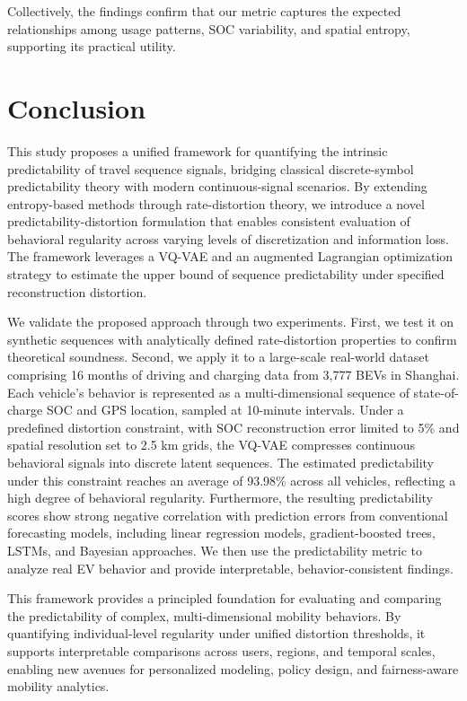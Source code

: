 \documentclass[12pt,review,authoryear]{elsarticle}
\theoremstyle{upright}
\begin{document}
Collectively, the findings confirm that our metric captures the expected relationships among usage patterns, SOC variability, and spatial entropy, supporting its practical utility.


\section{Conclusion}
\label{conclusion}
This study proposes a unified framework for quantifying the intrinsic predictability of travel sequence signals, bridging classical discrete-symbol predictability theory with modern continuous-signal scenarios. By extending entropy-based methods through rate-distortion theory, we introduce a novel predictability-distortion formulation that enables consistent evaluation of behavioral regularity across varying levels of discretization and information loss. The framework leverages a VQ-VAE and an augmented Lagrangian optimization strategy to estimate the upper bound of sequence predictability under specified reconstruction distortion.

We validate the proposed approach through two experiments. First, we test it on synthetic sequences with analytically defined rate-distortion properties to confirm theoretical soundness. Second, we apply it to a large-scale real-world dataset comprising 16 months of driving and charging data from 3,777 BEVs in Shanghai. Each vehicle’s behavior is represented as a multi-dimensional sequence of state-of-charge SOC and GPS location, sampled at 10-minute intervals. Under a predefined distortion constraint, with SOC reconstruction error limited to 5\% and spatial resolution set to 2.5 km grids, the VQ-VAE compresses continuous behavioral signals into discrete latent sequences. The estimated predictability under this constraint reaches an average of 93.98\% across all vehicles, reflecting a high degree of behavioral regularity. Furthermore, the resulting predictability scores show strong negative correlation with prediction errors from conventional forecasting models, including linear regression models, gradient-boosted trees, LSTMs, and Bayesian approaches. We then use the predictability metric to analyze real EV behavior and provide interpretable, behavior-consistent findings.

This framework provides a principled foundation for evaluating and comparing the predictability of complex, multi-dimensional mobility behaviors. By quantifying individual-level regularity under unified distortion thresholds, it supports interpretable comparisons across users, regions, and temporal scales, enabling new avenues for personalized modeling, policy design, and fairness-aware mobility analytics.
\end{document}
